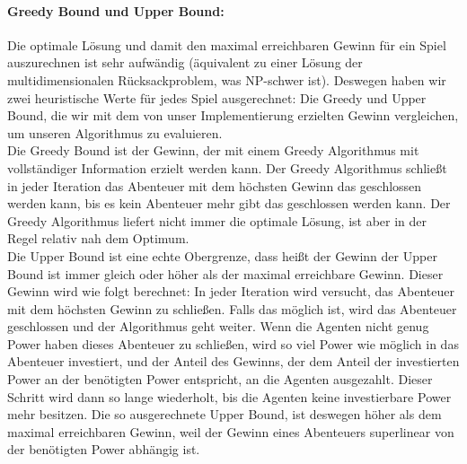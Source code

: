 \documentclass[fleqn,10pt]{SelfArx} %
\begin{document}
\paragraph{Greedy Bound und Upper Bound:}
Die optimale Lösung und damit den maximal erreichbaren Gewinn für ein Spiel auszurechnen ist sehr aufwändig (äquivalent zu einer Lösung der multidimensionalen Rücksackproblem, was NP-schwer ist). Deswegen haben wir zwei heuristische Werte für jedes Spiel ausgerechnet: Die Greedy und Upper Bound, die wir mit dem von unser Implementierung erzielten Gewinn vergleichen, um unseren Algorithmus zu evaluieren. \\
Die Greedy Bound ist der Gewinn, der mit einem Greedy Algorithmus mit vollständiger Information erzielt werden kann. Der Greedy Algorithmus schließt in jeder Iteration das Abenteuer mit dem höchsten Gewinn das geschlossen werden kann, bis es kein Abenteuer mehr gibt das geschlossen werden kann. Der Greedy Algorithmus liefert nicht immer die optimale Lösung, ist aber in der Regel relativ nah dem Optimum.\\
Die Upper Bound ist eine echte Obergrenze, dass heißt der Gewinn der Upper Bound ist immer gleich oder höher als der maximal erreichbare Gewinn. Dieser Gewinn wird wie folgt berechnet: In jeder Iteration wird versucht, das Abenteuer mit dem höchsten Gewinn zu schließen. Falls das möglich ist, wird das Abenteuer geschlossen und der Algorithmus geht weiter. Wenn die Agenten nicht genug Power haben dieses Abenteuer zu schließen, wird so viel Power wie möglich in das Abenteuer investiert, und der Anteil des Gewinns, der dem Anteil der investierten Power an der benötigten Power entspricht, an die Agenten ausgezahlt. Dieser Schritt wird dann so lange wiederholt, bis die Agenten keine investierbare Power mehr besitzen. Die so ausgerechnete Upper Bound, ist deswegen höher als dem maximal erreichbaren Gewinn, weil der Gewinn eines Abenteuers superlinear von der benötigten Power abhängig ist.
\end{document}
